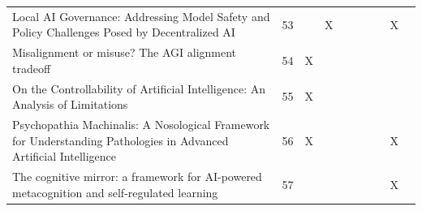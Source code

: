 \begin{landscape}
\begin{longtable}{|p{17cm}|c|c|c|c|c|c|c|c|c|}
		Local AI Governance: Addressing Model Safety and Policy Challenges Posed by Decentralized AI                                                            & 53          &                                    & X                                                         &                                                       &                                                            &                                           &                                              & X                                                  &                                    \\
		Misalignment or misuse? The AGI alignment tradeoff                                                                                                      & 54          & X                                  &                                                           &                                                       &                                                            &                                           &                                              &                                                    &                                    \\
		On the Controllability of Artificial Intelligence: An Analysis of Limitations                                                                           & 55          & X                                  &                                                           &                                                       &                                                            &                                           &                                              &                                                    &                                    \\
		Psychopathia Machinalis: A Nosological Framework for Understanding Pathologies in Advanced Artificial Intelligence                                      & 56          & X                                  &                                                           &                                                       &                                                            &                                           &                                              & X                                                  &                                    \\
		The cognitive mirror: a framework for AI-powered metacognition and self-regulated learning                                                              & 57          &                                    &                                                           &                                                       &                                                            &                                           &                                              & X                                                  &                                    \\

\end{longtable}
\end{landscape}
